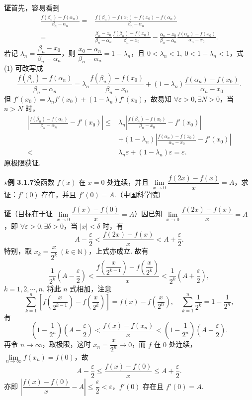 \documentclass[UTF8, 12pt, fontset=fandol, oneside]{ctexart}
\begin{document}
\noindent\textbf{证}\quad 首先，容易看到
\begin{equation}
\begin{aligned}
\frac{f(\beta_n)-f(\alpha_n)}{\beta_n-\alpha_n}
={}&\frac{f(\beta_n)-f(x_0)+f(x_0)-f(\alpha_n)}{\beta_n-\alpha_n}\\
={}&\frac{\beta_n-x_0}{\beta_n-\alpha_n}\frac{f(\beta_n)-f(x_0)}{\beta_n-x_0}
  -\frac{\alpha_n-x_0}{\beta_n-\alpha_n}\frac{f(\alpha_n)-f(x_0)}{\alpha_n-x_0}.
\end{aligned}
\tag{1}
\end{equation}
若记 $\lambda_n=\dfrac{\beta_n-x_0}{\beta_n-\alpha_n}$，则 $\dfrac{x_0-\alpha_n}{\beta_n-\alpha_n}=1-\lambda_n$，且 $0<\lambda_n<1,\ 0<1-\lambda_n<1$，式 (1) 可改写成
\[
  \frac{f(\beta_n)-f(\alpha_n)}{\beta_n-\alpha_n}
  =\lambda_n\frac{f(\beta_n)-f(x_0)}{\beta_n-x_0}
  +(1-\lambda_n)\frac{f(\alpha_n)-f(x_0)}{\alpha_n-x_0}.
\]
但 $f'(x_0)=\lambda_n f'(x_0)+(1-\lambda_n)f'(x_0)$，故易知 $\forall\varepsilon>0,\exists N>0$，当 $n>N$ 时，
\[
\begin{aligned}
\left|\frac{f(\beta_n)-f(\alpha_n)}{\beta_n-\alpha_n}-f'(x_0)\right|
\le{}&\lambda_n\left|\frac{f(\beta_n)-f(x_0)}{\beta_n-x_0}-f'(x_0)\right|\\
&+(1-\lambda_n)\left|\frac{f(\alpha_n)-f(x_0)}{\alpha_n-x_0}-f'(x_0)\right|\\
<&\lambda_n\varepsilon+(1-\lambda_n)\varepsilon=\varepsilon.
\end{aligned}
\]
原极限获证.

\noindent\textbf{$\star$例 3.1.7}\quad 设函数 $f(x)$ 在 $x=0$ 处连续，并且 $\lim\limits_{x\to0}\dfrac{f(2x)-f(x)}x=A$，求证：$f'(0)$ 存在，并且 $f'(0)=A$.（中国科学院）

\noindent\textbf{证}\quad （目标在于证 $\lim\limits_{x\to0}\dfrac{f(x)-f(0)}x=A$）因已知 $\lim\limits_{x\to0}\dfrac{f(2x)-f(x)}x=A$，即 $\forall\varepsilon>0,\exists\delta>0$，当 $|x|<\delta$ 时，有
\[
  A-\frac\varepsilon2<\frac{f(2x)-f(x)}x<A+\frac\varepsilon2.
\]
特别，取 $x_k=\dfrac{x}{2^k}\ (k\in\mathbb N)$，上式亦成立. 故有
\[
  \frac1{2^k}\left(A-\frac\varepsilon2\right)
  <\frac{f\left(\dfrac{x}{2^{k-1}}\right)-f\left(\dfrac{x}{2^k}\right)}x
  <\frac1{2^k}\left(A+\frac\varepsilon2\right),
\]
$k=1,2,\cdots,n$. 将此 $n$ 式相加，注意
\[
  \sum_{k=1}^n\left[f\left(\frac{x}{2^{k-1}}\right)-f\left(\frac{x}{2^k}\right)\right]
  =f(x)-f\left(\frac{x}{2^n}\right),\quad
  \sum_{k=1}^n\frac1{2^k}=1-\frac1{2^n},
\]
有
\[
  \left(1-\frac1{2^n}\right)\left(A-\frac\varepsilon2\right)
  <\frac{f(x)-f(x_n)}x
  <\left(1-\frac1{2^n}\right)\left(A+\frac\varepsilon2\right).
\]
再令 $n\to\infty$，取极限，这时 $x_n=\dfrac{x}{2^n}\to0$，而 $f$ 在 $0$ 处连续，$\lim\limits_{n\to\infty}f(x_n)=f(0)$，故
\[
  A-\frac\varepsilon2\le\frac{f(x)-f(0)}x\le A+\frac\varepsilon2.
\]
亦即 $\left|\dfrac{f(x)-f(0)}x-A\right|\le\dfrac\varepsilon2<\varepsilon$，$f'(0)$ 存在且 $f'(0)=A$.
\end{document}
